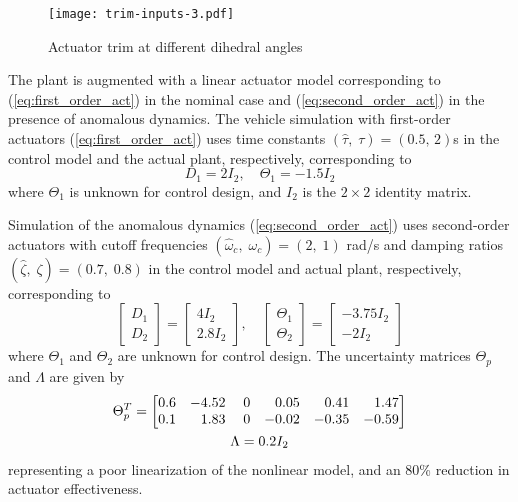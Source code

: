 \begin{figure}[htbp]
	\centering
	\texttt{[image: trim-inputs-3.pdf]}
	\caption{Actuator trim at different dihedral angles}
	\label{fig:trim-inputs}
\end{figure}

The plant is augmented with a linear actuator model corresponding to (\ref{eq:first_order_act}) in the nominal case and (\ref{eq:second_order_act}) in the presence of anomalous dynamics. The vehicle simulation with first-order actuators (\ref{eq:first_order_act}) uses time constants $(\hat{\tau},\;\tau) = (0.5,\,2)$s in the control model and the actual plant, respectively, corresponding to
\begin{equation}
D_1 = 2 I_2, \quad \Theta_1 = -1.5 I_2
\end{equation}
where $\Theta_1$ is unknown for control design, and $I_2$ is the $2 \times 2$ identity matrix. 

Simulation of the anomalous dynamics (\ref{eq:second_order_act}) uses second-order actuators with cutoff frequencies $(\hat{\omega}_c,\; \omega_c) = (2 ,\; 1)$ rad/s and damping ratios $(\hat{\zeta},\; \zeta) = (0.7,\; 0.8)$ in the control model and actual plant, respectively, corresponding to
\begin{equation}
\begin{bmatrix}
	D_1 \\ D_2
\end{bmatrix} = \begin{bmatrix}
	4 I_2 \\ 2.8 I_2
\end{bmatrix}, \quad \begin{bmatrix}
	\Theta_1 \\ \Theta_2 
\end{bmatrix} = \begin{bmatrix}
	-3.75 I_2 \\ -2 I_2
\end{bmatrix}
\end{equation}
where $\Theta_1$ and $\Theta_2$ are unknown for control design. The uncertainty matrices $\Theta_p$ and $\Lambda$ are given by
\begin{equation}
\begin{gathered}
\Theta_{p}^{T}=\begin{bmatrix}
0.6 & -4.52 & \; 0 & \hfill 0.05 & \hfill 0.41 & \hfill 1.47\\
0.1 & \hfill 1.83 & \; 0 & -0.02 & -0.35 & -0.59
\end{bmatrix}\\ \Lambda = 0.2 I_2 \end{gathered}
\end{equation}
representing a poor linearization of the nonlinear model, and an 80\% reduction in actuator effectiveness.


